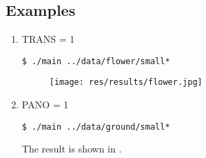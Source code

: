 \subsection{Examples}
\begin{enumerate}
\item TRANS = 1
  \begin{lstlisting}
$ ./main ../data/flower/small*
  \end{lstlisting}
\begin{figure}[H]
  \centering
  \texttt{[image: res/results/flower.jpg]}
\end{figure}


  \item PANO = 1
    \begin{lstlisting}
$ ./main ../data/ground/small*
    \end{lstlisting}
    The result is shown in .
\end{enumerate}
